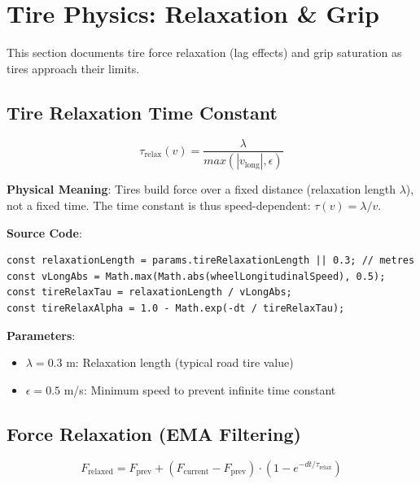 \section{Tire Physics: Relaxation \& Grip}

This section documents tire force relaxation (lag effects) and grip saturation as tires approach their limits.

\subsection{Tire Relaxation Time Constant}

\begin{equation}
  \tau_{\text{relax}}(v) = \frac{\lambda}{max(|v_{\text{long}}|, \epsilon)}
  \label{eq:relaxation-tau}
\end{equation}

\textbf{Physical Meaning}: Tires build force over a fixed distance (relaxation length $\lambda$), not a fixed time. The time constant is thus speed-dependent: $\tau(v) = \lambda / v$.

\textbf{Source Code}: 

\begin{lstlisting}[caption={Speed-dependent tire relaxation}]
const relaxationLength = params.tireRelaxationLength || 0.3; // metres
const vLongAbs = Math.max(Math.abs(wheelLongitudinalSpeed), 0.5);
const tireRelaxTau = relaxationLength / vLongAbs;
const tireRelaxAlpha = 1.0 - Math.exp(-dt / tireRelaxTau);
\end{lstlisting}

\textbf{Parameters}:
\begin{itemize}
  \item $\lambda = 0.3$ m: Relaxation length (typical road tire value)
  \item $\epsilon = 0.5$ m/s: Minimum speed to prevent infinite time constant
\end{itemize}

\subsection{Force Relaxation (EMA Filtering)}

\begin{equation}
  F_{\text{relaxed}} = F_{\text{prev}} + (F_{\text{current}} - F_{\text{prev}}) \cdot (1 - e^{-dt/\tau_{\text{relax}}})
  \label{eq:force-relaxation}
\end{equation}

